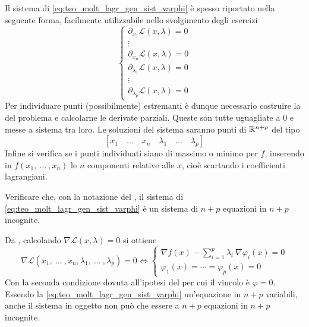 \begin{observation}
	\label{obs:sist_eqiv_lagr_ese}
	Il sistema di \cref{eq:teo_molt_lagr_gen_sist_varphi} è spesso riportato nella seguente forma, facilmente utilizzabile nello svolgimento degli esercizi
	\[
		\begin{cases}
			\partial_{x_1} \mathcal{L}(x, \lambda) = 0\\
			\vdots\\
			\partial_{x_n} \mathcal{L}(x, \lambda) = 0\\
			\partial_{\lambda_1} \mathcal{L}(x, \lambda) = 0\\
			\vdots\\
			\partial_{\lambda_p} \mathcal{L}(x, \lambda) = 0
		\end{cases}
	\]
	Per individuare punti (possibilmente) estremanti è dunque necessario costruire la  del problema e calcolarne le derivate parziali. Queste son tutte uguagliate a $0$ e messe a sistema tra loro. Le soluzioni del sistema saranno punti di $\mathbb{R}^{n + p}$ del tipo
	\[\left[ x_1 \quad \dots \quad x_n \quad \lambda_1 \quad \dots \quad \lambda_p \right]\]
	Infine si verifica se i punti individuati siano di massimo o minimo per $f$, inserendo in $f(x_1,\:\dotsc\:,x_n)$ le $n$ componenti relative alle $x$, cioè scartando i coefficienti lagrangiani.
\end{observation}
\begin{exercise}
	Verificare che, con la notazione del , il sistema di \cref{eq:teo_molt_lagr_gen_sist_varphi} è un sistema di $n + p$ equazioni in $n + p$ incognite.
	\begin{solution}
		Da , calcolando $\nabla \mathcal{L}(x, \lambda) = 0$ si ottiene
		\[
			\nabla \mathcal{L}(x_1,\:\dotsc\:, x_n, \lambda_1,\:\dotsc\:,\lambda_p) = 0
			\iff
			\begin{cases}
				\nabla f(x) - \sum\limits_{i=1}^{p} {\lambda_i \: \nabla \varphi_i (x)} = 0\\
				\varphi_1(x) = \cdots = \varphi_p(x) = 0
			\end{cases}
		\]
		Con la seconda condizione dovuta all'ipotesi del  per cui il vincolo è $\varphi = 0$.\\
		Essendo la \cref{eq:teo_molt_lagr_gen_sist_varphi} un'equazione in $n + p$ variabili, anche il sistema in oggetto non può che essere a $n + p$ equazioni in $n + p$ incognite.
	\end{solution}
\end{exercise}

